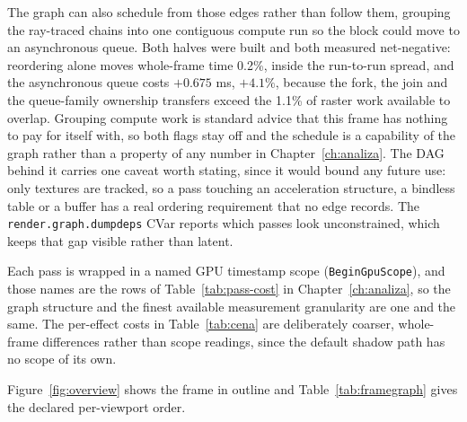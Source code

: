 The graph can also schedule from those edges rather than follow them, grouping the ray-traced chains
into one contiguous compute run so the block could move to an asynchronous queue. Both halves were
built and both measured net-negative: reordering alone moves whole-frame time 0.2\%, inside the
run-to-run spread, and the asynchronous queue costs $+0.675$ ms, $+4.1\%$, because the fork, the join
and the queue-family ownership transfers exceed the 1.1\% of raster work available to overlap.
Grouping compute work is standard advice that this frame has nothing to pay for itself with, so both
flags stay off and the schedule is a capability of the graph rather than a property of any number in
Chapter~\ref{ch:analiza}. The DAG behind it carries one caveat worth stating, since it would bound
any future use: only textures are tracked, so a pass touching an acceleration structure, a bindless
table or a buffer has a real ordering requirement that no edge records. The
\texttt{render.graph.dumpdeps} CVar reports which passes look unconstrained, which keeps that gap
visible rather than latent.

Each pass is wrapped in a named GPU timestamp scope (\texttt{BeginGpuScope}), and those names are the
rows of Table~\ref{tab:pass-cost} in Chapter~\ref{ch:analiza}, so the graph structure and the finest
available measurement granularity are one and the same. The per-effect costs in Table~\ref{tab:cena}
are deliberately coarser, whole-frame differences rather than scope readings, since the default shadow
path has no scope of its own.

Figure~\ref{fig:overview} shows the frame in outline and Table~\ref{tab:framegraph} gives the
declared per-viewport order.

